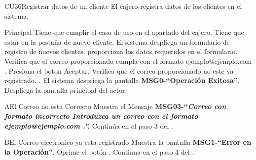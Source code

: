 \begin{UseCase}{CU36}{Registrar datos de un cliente}{
		El cajero registra datos de los clientes en el sistema.
	}
	\end{UseCase}
	\begin{UCtrayectoria}{Principal}
		\UCpaso[\UCactor] Tiene que cumplir el caso de uso  en el apartado del cajero.
		\UCpaso[\UCactor] Tiene que estar en la pestaña de nuevo cliente.
		\UCpaso El sistema despliega un formulario de registro de nuevos clientes. 
		\UCpaso [\UCactor] proporciona los datos requeridos en el formulario.
		\UCpaso Verifica que el correo proporcionado cumpla con el formato ejemplo@ejemplo.com .
		\UCpaso Presiona el boton Aceptar.
		\UCpaso Verifica que el correo proporcionado no este ya registrado. .
		\UCpaso El sistema despriega la pantalla  {\bf MSG0-``Operación Exitosa''}.
		\UCpaso Despliega la pantalla principal del actor.	
	\end{UCtrayectoria}

	\begin{UCtrayectoriaA}{A}{El Correo no esta Correcto}
			\UCpaso Muestra el Mensaje {\bf MSG03-``\em Correo con formato incorrecto Introduzca un correo con el formato ejemplo@ejemplo.com .''.}
			\UCpaso Continúa en el paso 3 del .
		\end{UCtrayectoriaA}
		\begin{UCtrayectoriaA}{B}{El Correo electronico ya esta registrado}
			\UCpaso Muestra la pantalla {\bf MSG1-``Error en la Operación''}.
			\UCpaso[\UCactor] Oprime el botón .
			\UCpaso[] Continua en el paso 4 del .
		\end{UCtrayectoriaA}		
		